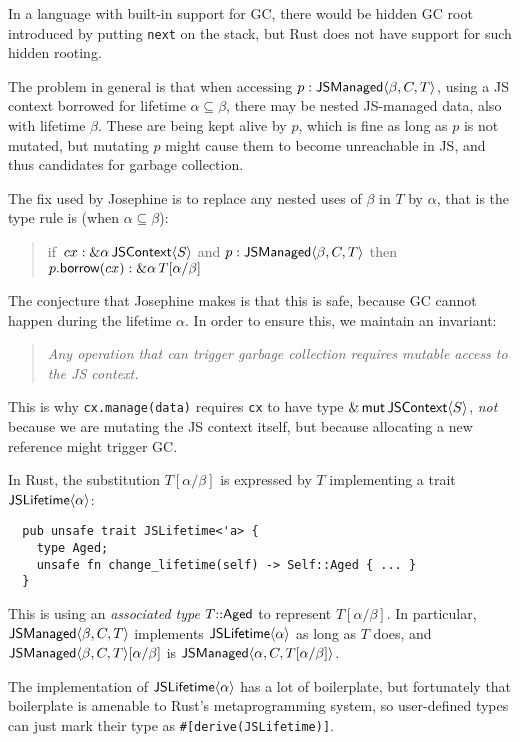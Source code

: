In a language with built-in support for GC, there would be hidden
GC root introduced by putting \verb|next| on the stack, but Rust does
not have support for such hidden rooting.

The problem in general is that when accessing $p:\mathsf{JSManaged}\langle \beta,C,T\rangle$,
using a JS context borrowed
for lifetime $\alpha\subseteq\beta$, there may be nested JS-managed
data, also with lifetime $\beta$. These are being kept alive by $p$,
which is fine as long as $p$ is not mutated, but mutating $p$
might cause them to become unreachable in JS, and thus candidates
for garbage collection.

The fix used by Josephine is to replace any nested uses of
$\beta$ in $T$ by $\alpha$, that is the type rule is
(when $\alpha \subseteq \beta$):
\begin{quote}
  if~$cx: \&\alpha\, \mathsf{JSContext}\langle S\rangle$ and $p: \mathsf{JSManaged}\langle \beta,C,T\rangle$
  then $p.\mathsf{borrow}(cx): \&\alpha\, T[\alpha/\beta]$
\end{quote}
The conjecture that Josephine makes is that this is safe, because
GC cannot happen during the lifetime $\alpha$. In order to ensure
this, we maintain an invariant:
\begin{quote}\em
  Any operation that can trigger garbage collection
  requires mutable access to the JS context.
\end{quote}
This is why \verb|cx.manage(data)| requires
\verb|cx| to have type $\&\,\mathsf{mut}\,\mathsf{JSContext}\langle S\rangle$, \emph{not} because
we are mutating the JS context itself, but because allocating
a new reference might trigger GC.

In Rust, the substitution $T[\alpha/\beta]$ is expressed by
$T$ implementing a trait $\mathsf{JSLifetime}\langle \alpha\rangle$:
\begin{verbatim}
  pub unsafe trait JSLifetime<'a> {
    type Aged;
    unsafe fn change_lifetime(self) -> Self::Aged { ... }
  }
\end{verbatim}
This is using an \emph{associated type} $T{::}\mathsf{Aged}$
to represent $T[\alpha/\beta]$.
In particular, $\mathsf{JSManaged}\langle \beta,C,T\rangle$ implements
$\mathsf{JSLifetime}\langle \alpha\rangle$ as long as $T$ does,
and $\mathsf{JSManaged}\langle \beta,C,T\rangle[\alpha/\beta]$ is $\mathsf{JSManaged}\langle \alpha,C,T[\alpha/\beta]\rangle$.

The implementation of $\mathsf{JSLifetime}\langle \alpha\rangle$ has a lot of boilerplate,
but fortunately that boilerplate is amenable to Rust's metaprogramming
system, so user-defined types can just mark their type as
\verb|#[derive(JSLifetime)]|.
